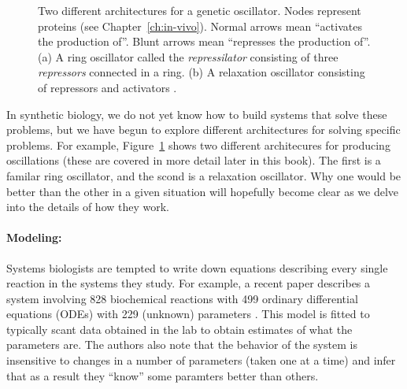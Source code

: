 \begin{figure}
\centering
\caption{\label{fig:oscillator}Two different architectures for a
  genetic oscillator. Nodes represent proteins (see
  Chapter~\ref{ch:in-vivo}). Normal arrows mean ``activates the
  production of''. Blunt arrows mean ``represses the production
  of''. (a) A ring oscillator \cite{elowitz-repressilator} called the
  {\em repressilator} consisting of three {\em repressors} connected
  in a ring. (b) A relaxation oscillator consisting of repressors and
  activators \cite{hasty-oscillator}.}
\end{figure}

In synthetic biology, we do not yet know how to build systems that
solve these problems, but we have begun to explore different
architectures for solving specific problems. For example,
Figure~\ref{fig:oscillator} shows two different architecures for
producing oscillations (these are covered in more detail later in this
book). The first is a familar ring oscillator, and the scond is a
relaxation oscillator. Why one would be better than the other in a
given situation will hopefully become clear as we delve into the
details of how they work. 

\paragraph{Modeling:} Systems biologists are tempted to write down
equations describing every single reaction in the systems they
study. For example, a recent paper describes a system involving 828
biochemical reactions with 499 ordinary differential equations (ODEs)
with 229 (unknown) parameters \cite{large-model}. This model is fitted
to typically scant data obtained in the lab to obtain estimates of
what the parameters are. The authors also note that the behavior of
the system is insensitive to changes in a number of parameters (taken
one at a time) and infer that as a result they ``know'' some paramters
better than others.

